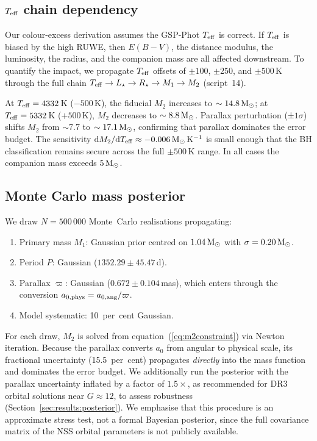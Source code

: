 \documentclass[usenatbib,fleqn]{mnras}
\newcommand{\Msun}{{\rm M}_\odot}
\begin{document}
\subsection{$T_{\rm eff}$ chain dependency}
\label{sec:methods:teff_chain}

Our colour-excess derivation assumes the GSP-Phot $T_{\rm eff}$
is correct.  If $T_{\rm eff}$ is biased by the high RUWE, then
$E(B-V)$, the distance modulus, the luminosity, the radius, and
the companion mass are all affected downstream.  To quantify the
impact, we propagate $T_{\rm eff}$ offsets of
$\pm 100$, $\pm 250$, and $\pm 500\,$K through the full chain
$T_{\rm eff} \to L_\star \to R_\star \to M_1 \to M_2$
(script~14).

At $T_{\rm eff} = 4332\,$K ($-500$\,K), the fiducial $M_2$
increases to $\sim 14.8\,\Msun$; at
$T_{\rm eff} = 5332\,$K ($+500$\,K), $M_2$ decreases to
$\sim 8.8\,\Msun$.  Parallax perturbation (±$1\sigma$) shifts
$M_2$ from $\sim 7.7$ to $\sim 17.1\,\Msun$, confirming that
parallax dominates the error budget.  The sensitivity
${\rm d}M_2/{\rm d}T_{\rm eff} \approx -0.006\,\Msun\,{\rm K}^{-1}$
is small enough that the BH classification remains secure
across the full $\pm 500\,$K range.  In all cases the companion
mass exceeds $5\,\Msun$.

\subsection{Monte Carlo mass posterior}
\label{sec:methods:mc}

We draw $N = 500\,000$ Monte~Carlo realisations propagating:
\begin{enumerate}
\item Primary mass $M_1$: Gaussian prior centred on
  $1.04\,\Msun$ with $\sigma = 0.20\,\Msun$.
\item Period $P$: Gaussian ($1352.29 \pm 45.47$\,d).
\item Parallax $\varpi$: Gaussian ($0.672 \pm 0.104$\,mas),
  which enters through the conversion
  $a_{0,{\rm phys}} = a_{0,{\rm ang}} / \varpi$.
\item Model systematic: 10~per~cent Gaussian.
\end{enumerate}
For each draw, $M_2$ is solved from
equation~(\ref{eq:m2constraint}) via Newton iteration.
Because the parallax converts $a_0$ from angular to physical
scale, its fractional uncertainty (15.5~per~cent) propagates
\emph{directly} into the mass function and dominates the error
budget.  We additionally run the posterior with the parallax
uncertainty inflated by a factor of $1.5\times$, as
recommended for DR3 orbital solutions near $G \approx 12$,
to assess robustness (Section~\ref{sec:results:posterior}).
We emphasise that this procedure is an approximate stress test,
not a formal Bayesian posterior, since the full covariance matrix
of the NSS orbital parameters is not publicly available.
\end{document}
